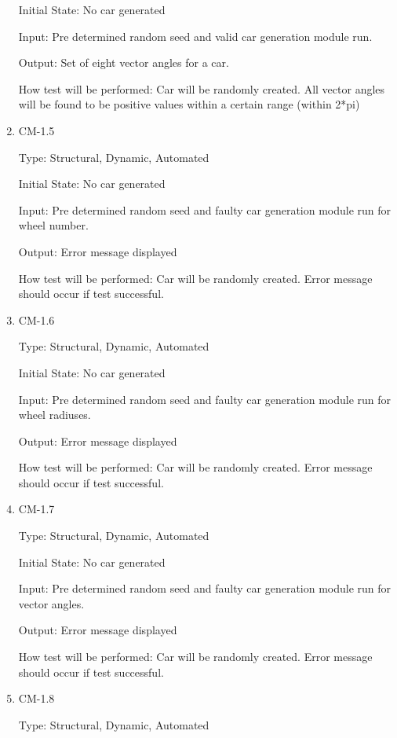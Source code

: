 \documentclass[12pt, titlepage]{article}
\begin{document}
\begin{enumerate}
Initial State: No car generated
					
Input: Pre determined random seed and valid car generation module run.
					
Output: Set of eight vector angles for a car.
					
How test will be performed: Car will be randomly created. All vector angles will be found to be positive values within a certain range (within 2*pi)

\item{CM-1.5\\}

Type: Structural, Dynamic, Automated
					
Initial State: No car generated
					
Input: Pre determined random seed and faulty car generation module run for wheel number.
					
Output: Error message displayed
					
How test will be performed:  Car will be randomly created. Error message should occur if test successful.

\item{CM-1.6\\}

Type: Structural, Dynamic, Automated
					
Initial State: No car generated
					
Input: Pre determined random seed and faulty car generation module run for wheel radiuses.
					
Output: Error message displayed
					
How test will be performed: Car will be randomly created. Error message should occur if test successful.

\item{CM-1.7\\}

Type: Structural, Dynamic, Automated
					
Initial State: No car generated
					
Input: Pre determined random seed and faulty car generation module run for vector angles.
					
Output: Error message displayed
					
How test will be performed: Car will be randomly created. Error message should occur if test successful.

\item{CM-1.8\\}

Type: Structural, Dynamic, Automated
					

\end{enumerate}
\end{document}
